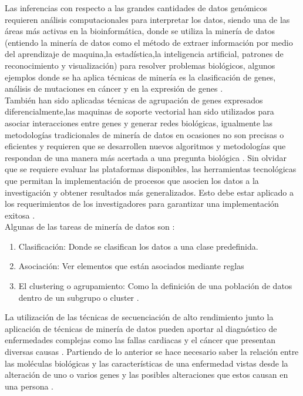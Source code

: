 {Las inferencias con respecto a las grandes cantidades de datos genómicos requieren análisis computacionales para interpretar los datos, siendo una de las áreas más activas en la bioinformática, donde se utiliza la minería de datos (entiendo la minería de datos como el método de extraer información por medio del aprendizaje de maquina,la estadística,la inteligencia artificial, patrones de reconocimiento y visualización) para resolver problemas biológicos, algunos ejemplos donde se ha aplica técnicas de minería es la clasificación de genes, análisis de mutaciones en cáncer y en la expresión de genes \cite{Littlefield}. \\

También han sido aplicadas técnicas de agrupación de genes expresados diferencialmente,las maquinas de soporte vectorial han sido utilizados para asociar interacciones entre genes y generar redes biológicas, igualmente las metodologías tradicionales de minería de datos en ocasiones no son precisas o eficientes y requieren que se desarrollen nuevos algoritmos y metodologías que respondan de una manera más acertada a una pregunta biológica \cite{Zaki2007}. Sin olvidar que se requiere evaluar las plataformas disponibles, las herramientas tecnológicas que permitan  la implementación de procesos que asocien los datos a  la investigación  y obtener resultados más generalizados.  Esto debe estar aplicado a los requerimientos de los investigadores para garantizar una implementación exitosa \cite{Bustos2007,Zaki2007}.\\

Algunas de las tareas de minería de datos son \cite{Littlefield}:

\begin{enumerate}[1.]
	\item Clasificación: Donde se clasifican los datos a una clase predefinida.
	\item Asociación: Ver elementos que están asociados mediante reglas
	\item El clustering o agrupamiento: Como la definición de una población de datos dentro de un subgrupo o cluster .
\end{enumerate}

La utilización de las técnicas de secuenciación de alto rendimiento junto  la aplicación de técnicas de minería de datos pueden aportar al diagnóstico de enfermedades complejas  como las fallas cardiacas y el cáncer que presentan diversas causas \cite{Hannah-Shmouni2015} . Partiendo de lo anterior se hace necesario saber la relación entre las moléculas biológicas y las características de una enfermedad vistas desde la alteración de uno o varios genes y las posibles alteraciones que estos causan en una persona \cite{Li2014}.

}
